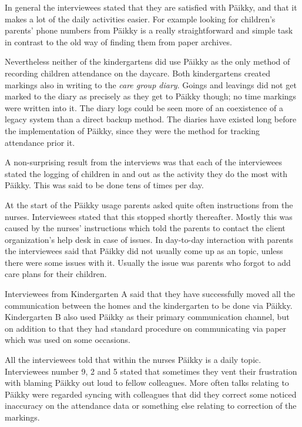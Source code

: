 In general the interviewees stated that they are satisfied with Päikky, and that it makes a lot of the daily activities easier. For example looking for children's parents' phone numbers from Päikky is a really straightforward and simple task in contrast to the old way of finding them from paper archives. 

Nevertheless neither of the kindergartens did use Päikky as the only method of recording children attendance on the daycare. Both kindergartens created markings also in writing to the \textit{care group diary}. Goings and leavings did not get marked to the diary as precisely as they get to Päikky though; no time markings were written into it. The diary logs could be seen more of an coexistence of a legacy system than a direct backup method. The diaries have existed long before the implementation of Päikky, since they were the method for tracking attendance prior it. 

A non-surprising result from the interviews was that each of the interviewees stated the logging of children in and out as the activity they do the most with Päikky. This was said to be done tens of times per day.

At the start of the Päikky usage parents asked quite often instructions from the nurses. Interviewees stated that this stopped shortly thereafter. Mostly this was caused by the nurses' instructions which told the parents to contact the client organization's help desk in case of issues. In day-to-day interaction with parents the interviewees said that Päikky did not usually come up as an topic, unless there were some issues with it. Usually the issue was parents who forgot to add care plans for their children.

Interviewees from Kindergarten A said that they have successfully moved all the communication between the homes and the kindergarten to be done via Päikky. Kindergarten B also used Päikky as their primary communication channel, but on addition to that they had standard procedure on communicating via paper which was used on some occasions.

All the interviewees told that within the nurses Päikky is a daily topic. Interviewees number 9, 2 and 5 stated that sometimes they vent their frustration with blaming Päikky out loud to fellow colleagues. More often talks relating to Päikky were regarded syncing with colleagues that did they correct some noticed inaccuracy on the attendance data or something else relating to correction of the markings.

